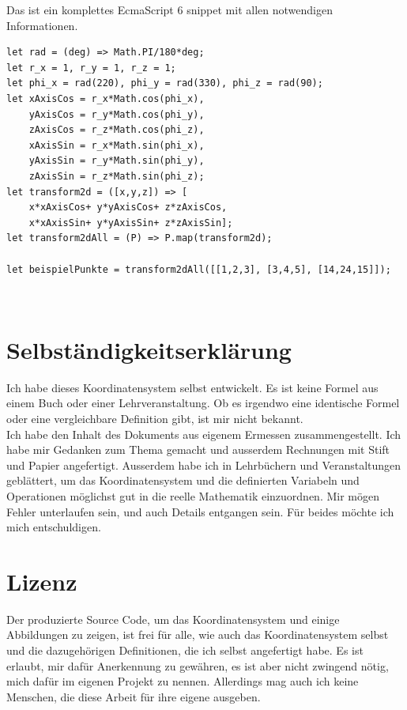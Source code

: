 \documentclass[a4paper]{article}
\begin{document}
\begin{example}
Das ist ein komplettes EcmaScript 6 snippet mit allen notwendigen Informationen.\\
\begin{lstlisting}
let rad = (deg) => Math.PI/180*deg;
let r_x = 1, r_y = 1, r_z = 1; 
let phi_x = rad(220), phi_y = rad(330), phi_z = rad(90); 
let xAxisCos = r_x*Math.cos(phi_x), 
    yAxisCos = r_y*Math.cos(phi_y),
    zAxisCos = r_z*Math.cos(phi_z),
    xAxisSin = r_x*Math.sin(phi_x), 
    yAxisSin = r_y*Math.sin(phi_y),
    zAxisSin = r_z*Math.sin(phi_z);
let transform2d = ([x,y,z]) => [
    x*xAxisCos+ y*yAxisCos+ z*zAxisCos,
    x*xAxisSin+ y*yAxisSin+ z*zAxisSin];
let transform2dAll = (P) => P.map(transform2d);

let beispielPunkte = transform2dAll([[1,2,3], [3,4,5], [14,24,15]]);
\end{lstlisting}
\end{example}\\


\section{Selbst\"andigkeitserkl\"arung}

Ich habe dieses Koordinatensystem selbst entwickelt. Es ist keine Formel aus einem Buch oder einer Lehrveranstaltung.
Ob es irgendwo eine identische Formel oder eine vergleichbare Definition gibt, ist mir nicht bekannt.\\

Ich habe den Inhalt des Dokuments aus eigenem Ermessen zusammengestellt. Ich habe mir Gedanken zum Thema gemacht und
ausserdem Rechnungen mit Stift und Papier angefertigt. Ausserdem habe ich in Lehrb\"uchern und Veranstaltungen gebl\"attert,
um das Koordinatensystem und die definierten Variabeln und Operationen m\"oglichst gut in die reelle Mathematik einzuordnen.
Mir m\"ogen Fehler unterlaufen sein, und auch Details entgangen sein. F\"ur beides m\"ochte ich mich entschuldigen.\\


\section{Lizenz}

Der produzierte Source Code, um das Koordinatensystem und einige Abbildungen zu zeigen, ist frei f\"ur alle,
wie auch das Koordinatensystem selbst und die dazugeh\"origen Definitionen, die ich selbst angefertigt habe.
Es ist erlaubt, mir daf\"ur Anerkennung zu gew\"ahren, es ist aber nicht zwingend n\"otig, mich daf\"ur im
eigenen Projekt zu nennen. Allerdings mag auch ich keine Menschen, die diese Arbeit f\"ur ihre eigene ausgeben.\\
\end{document}
